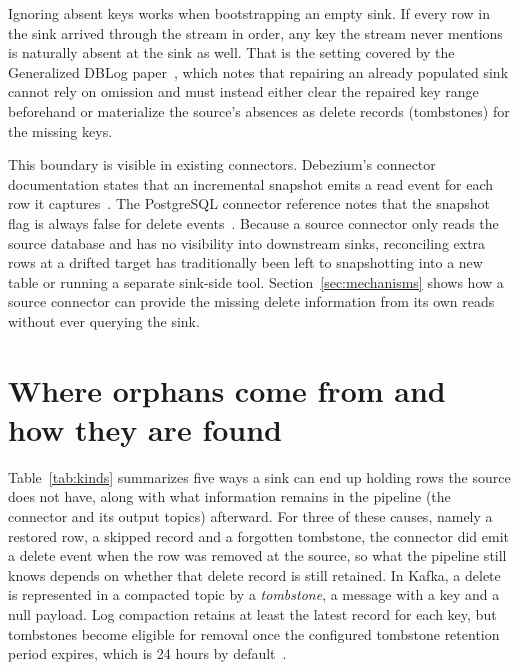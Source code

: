\documentclass[sigconf,nonacm,10pt]{acmart}
\begin{document}
Ignoring absent keys works when bootstrapping an empty sink. If every row in
the sink arrived through the stream in order, any key the stream never mentions
is naturally absent at the sink as well. That is the setting covered by the
Generalized DBLog paper~\cite{andreakis2026generalized}, which notes that
repairing an already populated sink cannot rely on omission and must instead
either clear the repaired key range beforehand or materialize the source's
absences as delete records (tombstones) for the missing keys.

This boundary is visible in existing connectors. Debezium's connector
documentation states that an incremental snapshot emits a read event for each
row it captures~\cite{debezium_mysql_connector,debezium_postgresql_connector}. 
The PostgreSQL connector reference notes that the snapshot flag is always
false for delete events~\cite{debezium_postgresql_connector}. Because a source
connector only reads the source database and has no visibility into downstream
sinks, reconciling extra rows at a drifted target has traditionally been left to
snapshotting into a new table or running a separate sink-side tool.
Section~\ref{sec:mechanisms} shows how a source connector can provide the
missing delete information from its own reads without ever querying the sink.

\section{Where orphans come from and how they are found}\label{sec:kinds}

Table~\ref{tab:kinds} summarizes five ways a sink can end up holding rows the source does not have, 
along with what information remains in the pipeline
(the connector and its output topics) afterward. For three of these causes,
namely a restored row, a skipped record and a forgotten tombstone, the
connector did emit a delete event when the row was removed at the source, so
what the pipeline still knows depends on whether that delete record is still
retained. In Kafka, a delete is represented in a compacted topic by a
\emph{tombstone}, a message with a key and a null payload. Log compaction
retains at least the latest record for each key, but tombstones become eligible 
for removal once the configured tombstone retention period expires, which is 24 hours by default~\cite{kafka_docs}.
\end{document}
